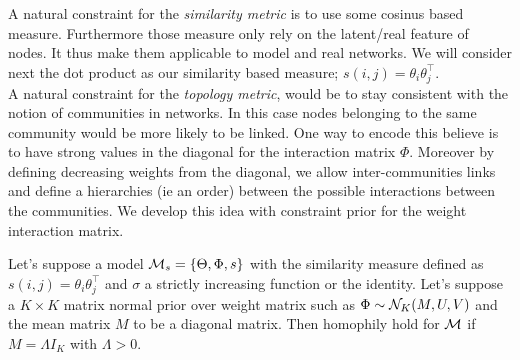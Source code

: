 A natural constraint for the \emph{similarity metric} is to use some cosinus based measure. Furthermore those measure only rely on the latent/real feature of nodes. It thus make them applicable to model and real networks. We will consider next the dot product as our similarity based measure; $s(i,j) = \theta_i \theta_j^\top$.~\\

A natural constraint for the \emph{topology metric}, would be to stay consistent with the notion of communities in networks. In this case nodes belonging to the same community would be more likely to be linked. One way to encode this believe is to have strong values in the diagonal for the interaction matrix $\Phi$. Moreover by defining decreasing weights from the diagonal, we allow inter-communities links and define a hierarchies (ie an order) between the possible interactions between the communities. We develop this idea with constraint prior for the weight interaction matrix.


\begin{proposition}[] \label{prop:hom_mn}
Let's suppose a model $ \mathcal{M}_s=\{\Theta, \Phi, s\}$ with the similarity measure defined as $s(i,j) = \theta_i \theta_j^\top$ and $\sigma$ a strictly increasing function or the identity. Let's suppose a $K\times K$ matrix normal prior over weight matrix such as $\Phi \sim \mathcal{N}_K(M, U, V)$ and the mean matrix $M$ to be a diagonal matrix. Then homophily hold for $\mathcal{M}$ if $M=\Lambda I_K$ with $\Lambda > 0$.
\end{proposition}

